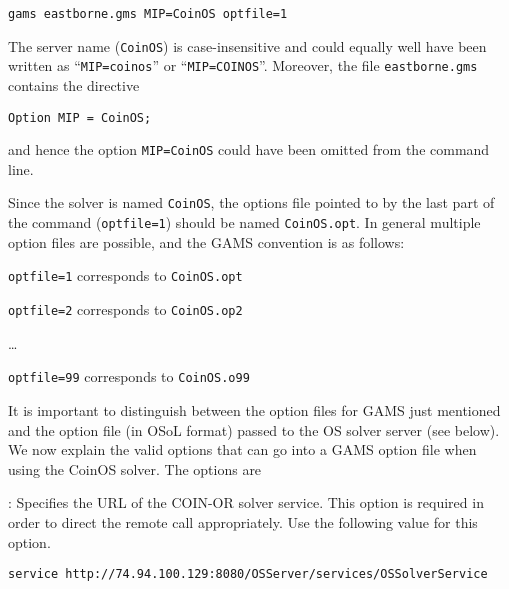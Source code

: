 \begin{verbatim} 
gams eastborne.gms MIP=CoinOS optfile=1
\end{verbatim}

The server name ({\tt CoinOS}) is case-insensitive and could equally well have been written as 
``{\tt MIP=coinos}'' or ``{\tt MIP=COINOS}''. Moreover, the file {\tt eastborne.gms} contains the directive

\begin{verbatim}
Option MIP = CoinOS;
\end{verbatim}

\noindent and hence the option {\tt MIP=CoinOS} could have been omitted from the command line.

Since the solver is named {\tt CoinOS}, the options file pointed to by the last part of the command
({\tt optfile=1}) should be named {\tt CoinOS.opt}. In general multiple option files are possible, and the GAMS convention is as follows:

{\tt optfile=1} corresponds to {\tt CoinOS.opt}

{\tt optfile=2} corresponds to {\tt CoinOS.op2}

{\ldots}

{\tt optfile=99} corresponds to {\tt CoinOS.o99}

\medskip
It is important to distinguish between the option files for GAMS just mentioned and the  option file (in OSoL format) passed to the OS solver server (see below).
We now explain the valid options that can go into a GAMS option file when using the CoinOS solver. 
The options are

\vskip 8pt
: Specifies the URL of  the COIN-OR solver service. 
This option is required in order to direct the remote call appropriately.
\vskip 8pt
Use the following value for this option.
\begin{verbatim}
service http://74.94.100.129:8080/OSServer/services/OSSolverService
\end{verbatim}


\iffalse
\vskip 8pt
\noindent {\tt solver  (string)}:   Specifies the solver that is used to solve an instance. 
Valid values are {\tt clp},  {\tt cbc}, {\tt glpk}, {\tt ipopt},  and {\tt bonmin}.  
If a solver name is specified that is not recognized, the default solver for the problem type is used.  
The value for the solver option is case insensitive. 
For example, if the file {\tt CoinOS.opt} contains the two lines
\begin{verbatim}
service http://74.94.100.129:8080/OSServer/services/OSSolverService
solver glpk
\end{verbatim}
then executing
\begin{verbatim}
gams.exe eastborne.gms optfile 1
\end{verbatim}
will result in  using {\tt Glpk}  to solve the problem.   
\fi

